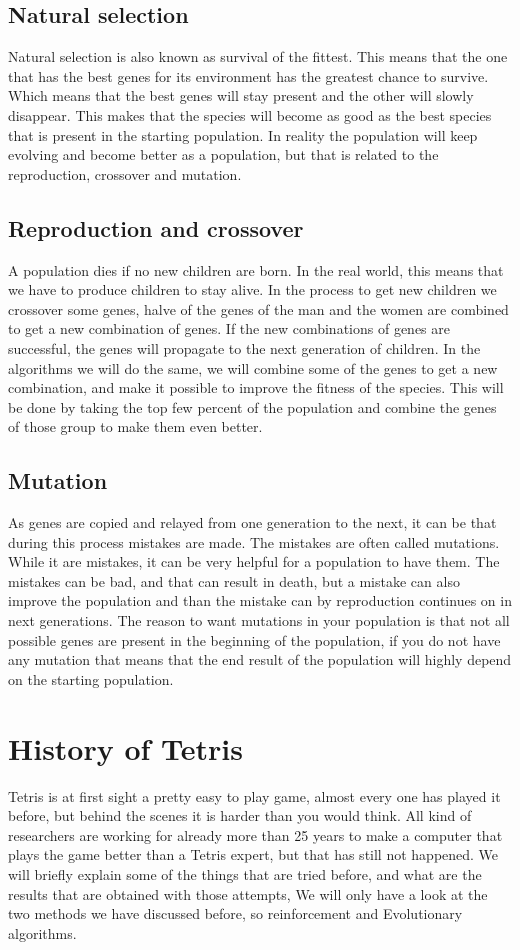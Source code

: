\documentclass{report}
\begin{document}
\subsection{Natural selection}
Natural selection is also known as survival of the fittest. This means that the one that has the best genes for its environment has the greatest chance to survive. Which means that the best genes will stay present and the other will slowly disappear. This makes that the species will become as good as the best species that is present in the starting population. In reality the population will keep evolving and become better as a population, but that is related to the reproduction, crossover and mutation.

\subsection{Reproduction and crossover}
A population dies if no new children are born. In the real world, this means that we have to produce children to stay alive. In the process to get new children we crossover some genes, halve of the genes of the man and the women are combined to get a new combination of genes. If the new combinations of genes are successful, the genes will propagate to the next generation of children. In the algorithms we will do the same, we will combine some of the genes to get a new combination, and make it possible to improve the fitness of the species. This will be done by taking the top few percent of the population and combine the genes of those group to make them even better.

\subsection{Mutation}
As genes are copied and relayed from one generation to the next, it can be that during this process mistakes are made. The mistakes are often called mutations. While it are mistakes, it can be very helpful for a population to have them. The mistakes can be bad, and that can result in death, but a mistake can also improve the population and than the mistake can by reproduction continues on in next generations. The reason to want mutations in your population is that not all possible genes are present in the beginning of the population, if you do not have any mutation that means that the end result of the population will highly depend on the starting population.

\section{History of Tetris}
Tetris is at first sight a pretty easy to play game, almost every one has played it before, but behind the scenes it is harder than you would think. All kind of researchers are working for already more than 25 years to make a computer that plays the game better than a Tetris expert, but that has still not happened. We will briefly explain some of the things that are tried before, and what are the results that are obtained with those attempts\cite{Tetris_ML}, We will only have a look at the two methods we have discussed before, so reinforcement and Evolutionary algorithms.
\end{document}
